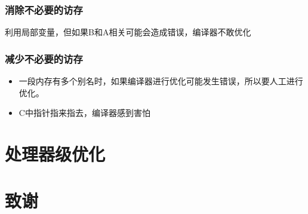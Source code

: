 \documentclass[12pt,AutoFakeBold,aspectratio=169,mathserif]{beamer}
\begin{document}
{\begin{frame}
    \end{frame}

    \begin{frame}
        \frametitle{消除不必要的访存}
    
        利用局部变量，但如果B和A相关可能会造成错误，编译器不敢优化

        \begin{figure}
        \end{figure}
    
    \end{frame}

    \begin{frame}
        \frametitle{减少不必要的访存}

        \begin{itemize}
            \item 一段内存有多个别名时，如果编译器进行优化可能发生错误，所以要人工进行优化。
            \item C中指针指来指去，编译器感到害怕
        \end{itemize}

    \end{frame}

    \section{处理器级优化}
    
    \section*{致谢}}
\end{document}
